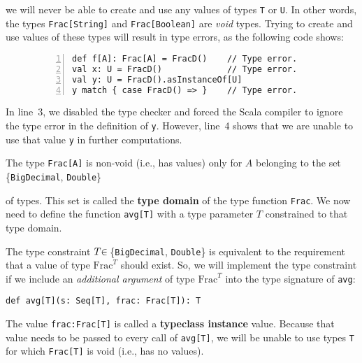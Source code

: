 \noindent we will never be able to create and use any values of types
\lstinline!T! or \lstinline!U!. In other words, the types \lstinline!Frac[String]!
and \lstinline!Frac[Boolean]! are \emph{void} types.
Trying to create and use values of these types will result in type
errors, as the following code shows:

\begin{wrapfigure}{l}{0.46\columnwidth}%
\vspace{-0.95\baselineskip}
\begin{lstlisting}[numbers=left]
def f[A]: Frac[A] = FracD()    // Type error.
val x: U = FracD()             // Type error.
val y: U = FracD().asInstanceOf[U]
y match { case FracD() => }    // Type error.
\end{lstlisting}

\vspace{-1.05\baselineskip}
\end{wrapfigure}%

\noindent In line~3, we disabled the type checker and forced the
Scala compiler to ignore the type error in the definition of \lstinline!y!.
However, line~4 shows that we are unable to use that value \lstinline!y!
in further computations.

The type \lstinline!Frac[A]! is non-void (i.e., has values) only
for $A$ belonging to the set \{\lstinline!BigDecimal!, \lstinline!Double!\}
\begin{comment}
$\{\text{BigDecimal},\text{Double}\}$
\end{comment}
{} of types. This set is called the \textbf{type domain}
of the type function \lstinline!Frac!. We now need to define the
function \lstinline!avg[T]! with a type parameter $T$ constrained
to that type domain. 

The type constraint $T\negthickspace\in\,$\{\lstinline!BigDecimal!,
\lstinline!Double!\} is equivalent to the requirement that a value
of type $\text{Frac}^{T}$ should exist. So, we will implement the
type constraint if we include an \emph{additional argument} of type
$\text{Frac}^{T}$ into the type signature of \lstinline!avg!:
\begin{lstlisting}
def avg[T](s: Seq[T], frac: Frac[T]): T
\end{lstlisting}
The value \lstinline!frac:Frac[T]! is called a \textbf{typeclass
instance} value. Because that value needs to be passed to every call
of \lstinline!avg[T]!, we will be unable to use types \lstinline!T!
for which \lstinline!Frac[T]! is void (i.e., has no values). 

